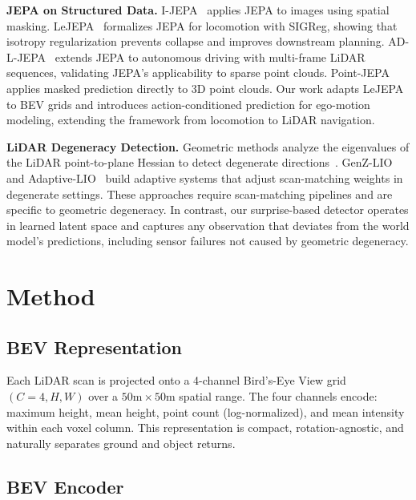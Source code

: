 \documentclass[10pt,twocolumn,letterpaper]{article}
\begin{document}
\noindent\textbf{JEPA on Structured Data.}
I-JEPA~\cite{assran2023ijepa} applies JEPA to images using spatial masking.
LeJEPA~\cite{balestriero2024lejepa} formalizes JEPA for locomotion with
SIGReg, showing that isotropy regularization prevents collapse and improves
downstream planning. AD-L-JEPA~\cite{zhu2025adljepa} extends JEPA to
autonomous driving with multi-frame LiDAR sequences, validating JEPA's
applicability to sparse point clouds. Point-JEPA~\cite{saito2025pointjepa}
applies masked prediction directly to 3D point clouds. Our work adapts
LeJEPA to BEV grids and introduces action-conditioned prediction for
ego-motion modeling, extending the framework from locomotion to LiDAR
navigation.

\noindent\textbf{LiDAR Degeneracy Detection.}
Geometric methods analyze the eigenvalues of the LiDAR point-to-plane
Hessian to detect degenerate directions~\cite{zhang2016degeneracy}.
GenZ-LIO~\cite{genzlio2024} and Adaptive-LIO~\cite{adaptivelio2024}
build adaptive systems that adjust scan-matching weights in degenerate
settings. These approaches require scan-matching pipelines and are
specific to geometric degeneracy. In contrast, our surprise-based detector
operates in learned latent space and captures any observation that
deviates from the world model's predictions, including sensor failures
not caused by geometric degeneracy.

\section{Method}
\label{sec:method}

\subsection{BEV Representation}

Each LiDAR scan is projected onto a 4-channel Bird's-Eye View grid
$(C{=}4, H, W)$ over a $50\text{m}{\times}50\text{m}$ spatial range.
The four channels encode: maximum height, mean height, point count
(log-normalized), and mean intensity within each voxel column.
This representation is compact, rotation-agnostic, and naturally
separates ground and object returns.

\subsection{BEV Encoder}
\end{document}
